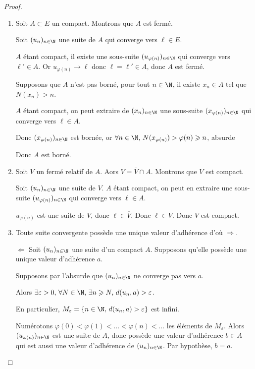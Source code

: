 \begin{proof}~
    \begin{enumerate}
        \item Soit $A \subset E$ un compact. Montrons que $A$ est fermé.

        Soit $(u_n)_{n \in \N}$ une suite de $A$ qui converge vers $\ell \in E$.

        $A$ étant compact, il existe une sous-suite $(u_{\varphi(n)})_{n \in \N}$ qui converge vers
        $\ell' \in A$. Or $u_{\varphi(n)} \to \ell$ donc $\ell = \ell' \in A$, donc $A$ est fermé.

        Supposons que $A$ n'est pas borné, pour tout $n \in \N$, il existe 
        $x_n \in A$ tel que $N(x_n) > n$.

        $A$ étant compact, on peut extraire de $(x_n)_{n \in \N}$ une sous-suite $(x_{\varphi(n)})_{n \in \N}$ qui converge vers $\ell \in A$.

        Donc $(x_{\varphi(n)})_{n \in \N}$ est bornée, or $\forall n \in \N, \, N(x_{\varphi(n)}) > \varphi(n) \geqslant n$, absurde 

        Donc $A$ est borné.

        \item Soit $V$ un fermé relatif de $A$. Aors $V = \overline V \cap A$. Montrons 
        que $V$ est compact. 

        Soit $(u_n)_{n \in \N}$ une suite de $V$. $A$ étant compact, on peut en extraire 
        une sous-suite $(u_{\varphi(n)})_{n \in \N}$ qui converge vers $\ell \in A$.

        $u_{\varphi(n)} $ est une suite de $V$, donc $\ell \in \overline V$. Donc 
        $\ell \in V$. Donc $V$ est compact.

        \item Toute suite convergente possède une unique valeur d'adhérence d'où $\Rightarrow$. 

        $\Leftarrow$ Soit $(u_n)_{n \in \N}$ une suite d'un compact $A$. Supposons qu'elle possède 
        une unique valeur d'adhérence $a$.

        Supposons par l'absurde que $(u_n)_{n \in \N}$ ne converge pas vers $a$.

        Alors $ \exists \varepsilon > 0, \, \forall N \in \N, \, \exists n \geqslant N, \, d(u_n, a) > \varepsilon$.

        En particulier, $M_\varepsilon = \{ n \in \N, \, d(u_n, a) > \varepsilon \}$ est infini. 

        Numérotons $\varphi(0) < \varphi(1) < \ldots < \varphi(n) < \ldots$ les éléments
        de $M_\varepsilon$. Alors $(u_{\varphi(n)})_{n \in \N}$ est une suite de $A$, donc 
        possède une valeur d'adhérence $b \in A$ qui est aussi une valeur d'adhérence de 
        $(u_n)_{n \in \N}$. Par hypothèse, $b = a$.


\end{enumerate}
\end{proof}
